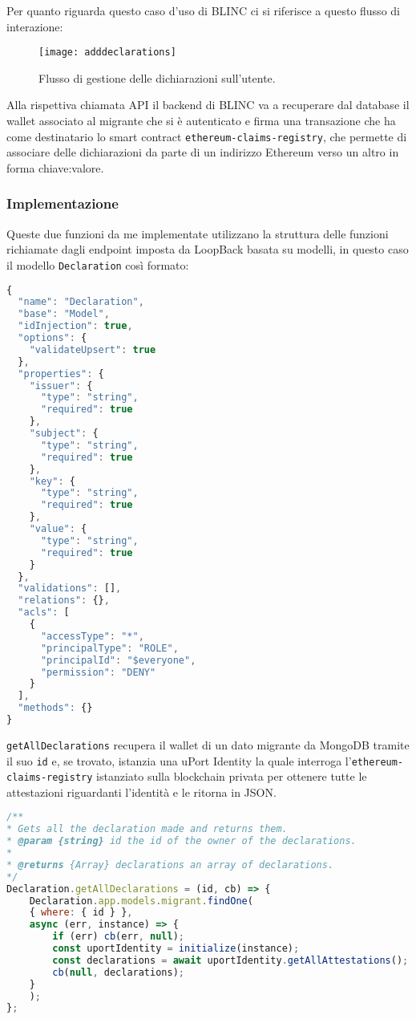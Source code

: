 Per quanto riguarda questo caso d’uso di BLINC ci si
riferisce a questo flusso di interazione:

\begin{figure}[!ht]
    \texttt{[image: adddeclarations]}
    \caption{Flusso di gestione delle dichiarazioni sull'utente.}
    \label{fig:adddeclarations}
  \end{figure}

Alla rispettiva chiamata API il backend di BLINC va a recuperare dal database
il wallet associato al migrante che si è autenticato e firma una transazione
che ha come destinatario lo smart contract \newline 
\texttt{ethereum-claims-registry}, che permette
di associare delle dichiarazioni da parte di un indirizzo Ethereum 
verso un altro in forma chiave:valore.

\subsubsection{Implementazione}

Queste due funzioni da me implementate utilizzano la struttura delle funzioni
richiamate dagli endpoint imposta da LoopBack basata su modelli, in questo caso
il modello \texttt{Declaration} così formato:

\begin{lstlisting}[language=JavaScript, numbers=none]
{
  "name": "Declaration",
  "base": "Model",
  "idInjection": true,
  "options": {
    "validateUpsert": true
  },
  "properties": {
    "issuer": {
      "type": "string",
      "required": true
    },
    "subject": {
      "type": "string",
      "required": true
    },
    "key": {
      "type": "string",
      "required": true
    },
    "value": {
      "type": "string",
      "required": true
    }
  },
  "validations": [],
  "relations": {},
  "acls": [
    {
      "accessType": "*",
      "principalType": "ROLE",
      "principalId": "$everyone",
      "permission": "DENY"
    }
  ],
  "methods": {}
}
\end{lstlisting}

\texttt{getAllDeclarations} recupera il wallet di
un dato migrante da MongoDB tramite il suo \texttt{id}
e, se trovato, istanzia una uPort Identity la quale
interroga l'\texttt{ethereum-claims-registry} istanziato sulla blockchain privata
per ottenere tutte le attestazioni riguardanti l'identità e le ritorna in JSON.

\begin{lstlisting}[language=JavaScript, numbers=none]
/**
* Gets all the declaration made and returns them.
* @param {string} id the id of the owner of the declarations.
*
* @returns {Array} declarations an array of declarations.
*/
Declaration.getAllDeclarations = (id, cb) => {
    Declaration.app.models.migrant.findOne(
    { where: { id } },
    async (err, instance) => {
        if (err) cb(err, null);
        const uportIdentity = initialize(instance);
        const declarations = await uportIdentity.getAllAttestations();
        cb(null, declarations);
    }
    );
};
\end{lstlisting}


